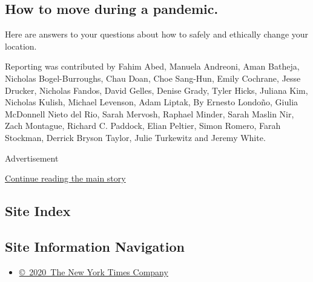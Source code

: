 \hypertarget{how-to-move-during-a-pandemic}{%
\subsection{How to move during a
pandemic.}\label{how-to-move-during-a-pandemic}}

Here are answers to your questions about how to safely and ethically
change your location.

Reporting was contributed by Fahim Abed, Manuela Andreoni, Aman Batheja,
Nicholas Bogel-Burroughs, Chau Doan, Choe Sang-Hun, Emily Cochrane,
Jesse Drucker, Nicholas Fandos, David Gelles, Denise Grady, Tyler Hicks,
Juliana Kim, Nicholas Kulish, Michael Levenson, Adam Liptak, By Ernesto
Londoño, Giulia McDonnell Nieto del Rio, Sarah Mervosh, Raphael Minder,
Sarah Maslin Nir, Zach Montague, Richard C. Paddock, Elian Peltier,
Simon Romero, Farah Stockman, Derrick Bryson Taylor, Julie Turkewitz and
Jeremy White.

Advertisement

\protect\hyperlink{after-bottom}{Continue reading the main story}

\hypertarget{site-index}{%
\subsection{Site Index}\label{site-index}}

\hypertarget{site-information-navigation}{%
\subsection{Site Information
Navigation}\label{site-information-navigation}}

\begin{itemize}
\tightlist
\item
  \href{https://help.nytimes3xbfgragh.onion/hc/en-us/articles/115014792127-Copyright-notice}{©~2020~The
  New York Times Company}
\end{itemize}

